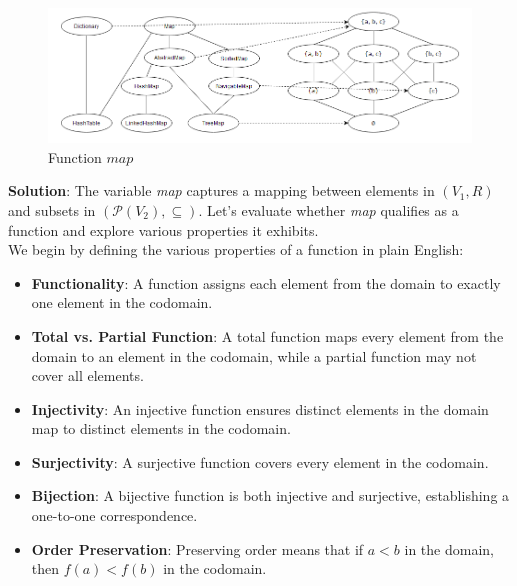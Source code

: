 \documentclass[12pt]{article}
\begin{document}
\begin{spacing}{1.5}
	\begin{figure}[htp]
		\centering
		\includegraphics[width=1.1\textwidth]{FunctionMapping_6_3.png}
		\caption{Function $map$}
		\label{fig:figure}
	\end{figure}
		
	\noindent \textbf{Solution}: The variable \textit{map} captures a mapping between elements in $(V_1, R)$ and subsets in $(\mathcal{P}(V_2), \subseteq)$. Let's evaluate whether \textit{map} qualifies as a function and explore various properties it exhibits.\\
		
	\noindent We begin by defining the various properties of a function in plain English:
		
	\begin{itemize}
		\item \textbf{Functionality}: A function assigns each element from the domain to exactly one element in the codomain.
		      		              
		\item \textbf{Total vs. Partial Function}: A total function maps every element from the domain to an element in the codomain, while a partial function may not cover all elements.
		      		          
		\item \textbf{Injectivity}: An injective function ensures distinct elements in the domain map to distinct elements in the codomain.
		      		          
		\item \textbf{Surjectivity}: A surjective function covers every element in the codomain.
		      		          
		\item \textbf{Bijection}: A bijective function is both injective and surjective, establishing a one-to-one correspondence.
		      		          
		\item \textbf{Order Preservation}: Preserving order means that if $a < b$ in the domain, then $f(a) < f(b)$ in the codomain.
		      		          

\end{itemize}
\end{spacing}
\end{document}
